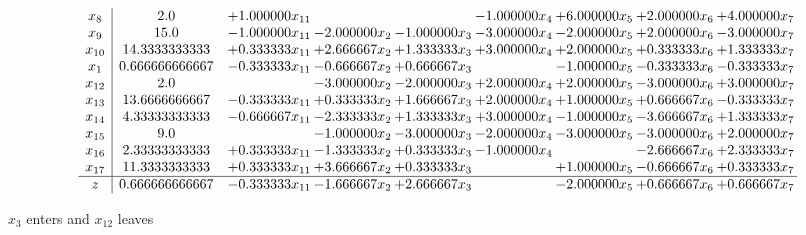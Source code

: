 \documentclass[10pt]{article}
\begin{document}
 \[\begin{array}{c| c c@{\hskip 2pt} c@{\hskip 2pt} c@{\hskip 2pt} c@{\hskip 2pt} c@{\hskip 2pt} c@{\hskip 2pt} c@{\hskip 2pt} }
 x_{8}   &  2.0 & + 1.000000 x_{11} &    &   & -1.000000 x_{4} & + 6.000000 x_{5} & + 2.000000 x_{6} & + 4.000000 x_{7}\\
 x_{9}   &  15.0 & -1.000000 x_{11} & -2.000000 x_{2} & -1.000000 x_{3} & -3.000000 x_{4} & -2.000000 x_{5} & + 2.000000 x_{6} & -3.000000 x_{7}\\
 x_{10}   &  14.3333333333 & + 0.333333 x_{11} & + 2.666667 x_{2} & + 1.333333 x_{3} & + 3.000000 x_{4} & + 2.000000 x_{5} & + 0.333333 x_{6} & + 1.333333 x_{7}\\
 x_{1}   &  0.666666666667 & -0.333333 x_{11} & -0.666667 x_{2} & + 0.666667 x_{3} &   & -1.000000 x_{5} & -0.333333 x_{6} & -0.333333 x_{7}\\
 x_{12}   &  2.0  &   & -3.000000 x_{2} & -2.000000 x_{3} & + 2.000000 x_{4} & + 2.000000 x_{5} & -3.000000 x_{6} & + 3.000000 x_{7}\\
 x_{13}   &  13.6666666667 & -0.333333 x_{11} & + 0.333333 x_{2} & + 1.666667 x_{3} & + 2.000000 x_{4} & + 1.000000 x_{5} & + 0.666667 x_{6} & -0.333333 x_{7}\\
 x_{14}   &  4.33333333333 & -0.666667 x_{11} & -2.333333 x_{2} & + 1.333333 x_{3} & + 3.000000 x_{4} & -1.000000 x_{5} & -3.666667 x_{6} & + 1.333333 x_{7}\\
 x_{15}   &  9.0  &   & -1.000000 x_{2} & -3.000000 x_{3} & -2.000000 x_{4} & -3.000000 x_{5} & -3.000000 x_{6} & + 2.000000 x_{7}\\
 x_{16}   &  2.33333333333 & + 0.333333 x_{11} & -1.333333 x_{2} & + 0.333333 x_{3} & -1.000000 x_{4} &   & -2.666667 x_{6} & + 2.333333 x_{7}\\
 x_{17}   &  11.3333333333 & + 0.333333 x_{11} & + 3.666667 x_{2} & + 0.333333 x_{3} &   & + 1.000000 x_{5} & -0.666667 x_{6} & + 0.333333 x_{7}\\
\hline
z    &  0.666666666667 & -0.333333 x_{11} & -1.666667 x_{2} & + 2.666667 x_{3} &   & -2.000000 x_{5} & + 0.666667 x_{6} & + 0.666667 x_{7}\\
\end{array}\]


 $ x_{3} $ enters and $ x_{12} $ leaves 
\end{document}
